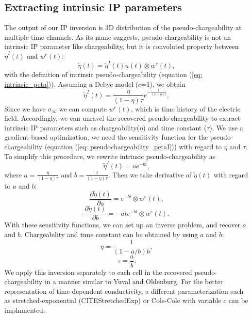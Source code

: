 \documentclass[a4paper, 11pt]{article}
\newcommand{\siginf}{\sigma_\infty}
\newcommand{\peta}{\tilde{\eta}}
\begin{document}
\subsection{Extracting intrinsic IP parameters}
\label{section: extract_intrinsicIP}
The output of our IP inversion is 3D distribution of the pseudo-chargeability at multiple time channels. 
As its name suggests, pseudo-chargeability is not an intrinsic IP parameter like chargeability, but it is convoluted property between $\peta^{I}(t)$ and $w^{e}(t)$:
\begin{equation}
  \peta(t) = \peta^{I}(t)u(t) \otimes w^e(t),
  \label{eq: pseudochargeability_petaI}
\end{equation}
with the definition of intrinsic pseudo-chargeability (equation (\ref{eq: intrinsic_peta})).
Assuming a Debye model ($c$=1), we obtain
\begin{equation}
    \peta^{I}(t) = \frac{\eta}{(1-\eta)\tau}e^{-\frac{t}{(1-\eta)\tau}},
    \label{eq: intrinsic_peta_debye}
\end{equation}
Since we have $\siginf$ we can compute $w^e(t)$, which is time history of the electric field. 
Accordingly, we can unravel the recovered pseudo-chargeability to extract intrinsic IP parameters such as chargeability($\eta$) and time constant ($\tau$). 
We use a gradient-based optimization, we need the sensitivity function for the pseudo-chargeability (equation (\ref{eq: pseudochargeability_petaI})) with regard to $\eta$ and $\tau$. 
To simplify this procedure, we rewrite intrinsic pseudo-chargeability as 
\begin{equation}
  \peta^{I}(t) = a e^{-bt},
\end{equation}
where $a = \frac{\eta}{(1-\eta)\tau}$ and $b = \frac{t}{(1-\eta)\tau}$. 
Then we take derivative of $\peta(t)$ with regard to $a$ and $b$:
\begin{equation}
  \frac{\partial \peta(t)}{\partial a} = e^{-bt} \otimes w^e(t),
\end{equation}
\begin{equation}
  \frac{\partial \peta(t)}{\partial b} = -ate^{-bt} \otimes w^e(t).
\end{equation}
With these sensitivity functions, we can set up an inverse problem, and recover $a$ and $b$. 
Chargeability and time constant can be obtained by using $a$ and $b$:
\begin{equation}
  \eta =  \frac{1}{(1-a/b)b},
\end{equation}
\begin{equation}
  \tau =  \frac{a}{b}.
\end{equation}
We apply this inversion separately to each cell in the recovered pseudo-chargeability  in a manner similar to Yuval and Oldenburg.
For the better representation of time-dependent conductivity, a different parameterization such as stretched-exponential (CITEStretchedExp) or Cole-Cole with variable $c$ can be implnmented. 
\end{document}
